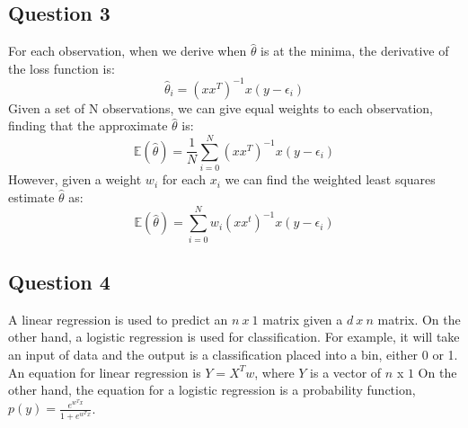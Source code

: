 \documentclass{article}
\begin{document}
\subsection*{Question 3}
For each observation, when we derive when $\hat{\theta}$ is at the minima, the derivative of
the loss function is:
\begin{equation}
  \hat\theta_i = (xx^T)^{-1}x(y-\epsilon_i)
\end{equation}
Given a set of N observations, we can give equal weights to each observation, finding that the approximate $\hat\theta$ is:
\begin{equation}
  \mathbb{E}(\hat\theta) = \frac{1}{N}\sum_{i=0}^N(xx^T)^{-1}x(y-\epsilon_i)
\end{equation}
However, given a weight $w_i$ for each $x_i$ we can find the weighted least squares estimate $\hat\theta$ as:
\begin{equation}
  \mathbb{E}(\hat\theta) = \sum_{i=0}^{N}w_i(xx^t)^{-1}x(y-\epsilon_i)
\end{equation}
\subsection*{Question 4}
A linear regression is used to predict an $n \ x \ 1$ matrix given a $d \ x\ n$ matrix.
On the other hand, a logistic regression is used for classification. For example, it will take an input of data
and the output is a classification placed into a bin, either 0 or 1.
An equation for linear regression is $Y = X^Tw$, where $Y$ is a vector of $n$ x $1$
On the other hand, the equation for a logistic regression is a probability function,
$p(y) = \frac{e^{w^Tx}}{{1 + e^{w^Tx}}}$.
\end{document}
